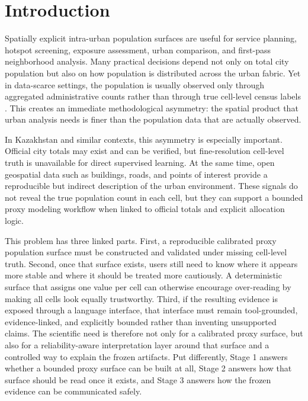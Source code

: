 \section{Introduction}

Spatially explicit intra-urban population surfaces are useful for service planning, hotspot screening, exposure assessment, urban comparison, and first-pass neighborhood analysis. Many practical decisions depend not only on total city population but also on how population is distributed across the urban fabric. Yet in data-scarce settings, the population is usually observed only through aggregated administrative counts rather than through true cell-level census labels \cite{Leyk2019,Mennis2009,Stevens2015}. This creates an immediate methodological asymmetry: the spatial product that urban analysis needs is finer than the population data that are actually observed.

In Kazakhstan and similar contexts, this asymmetry is especially important. Official city totals may exist and can be verified, but fine-resolution cell-level truth is unavailable for direct supervised learning. At the same time, open geospatial data such as buildings, roads, and points of interest provide a reproducible but indirect description of the urban environment. These signals do not reveal the true population count in each cell, but they can support a bounded proxy modeling workflow when linked to official totals and explicit allocation logic.

This problem has three linked parts. First, a reproducible calibrated proxy population surface must be constructed and validated under missing cell-level truth. Second, once that surface exists, users still need to know where it appears more stable and where it should be treated more cautiously. A deterministic surface that assigns one value per cell can otherwise encourage over-reading by making all cells look equally trustworthy. Third, if the resulting evidence is exposed through a language interface, that interface must remain tool-grounded, evidence-linked, and explicitly bounded rather than inventing unsupported claims. The scientific need is therefore not only for a calibrated proxy surface, but also for a reliability-aware interpretation layer around that surface and a controlled way to explain the frozen artifacts. Put differently, Stage 1 answers whether a bounded proxy surface can be built at all, Stage 2 answers how that surface should be read once it exists, and Stage 3 answers how the frozen evidence can be communicated safely.

